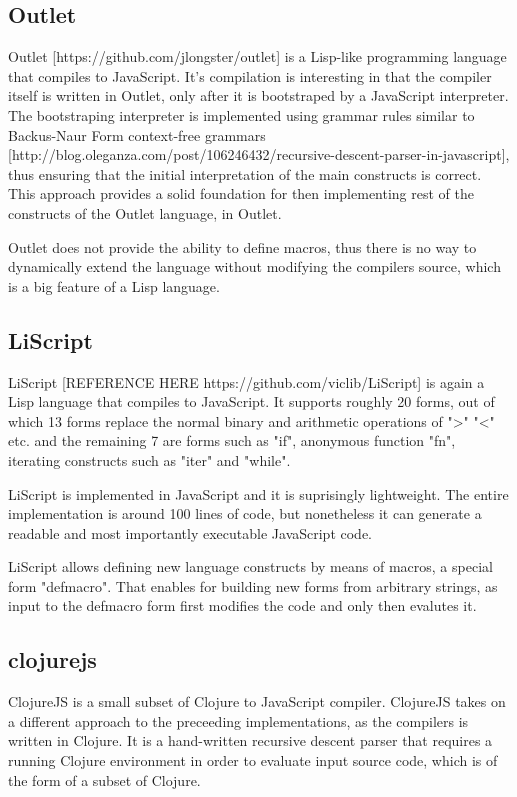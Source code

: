 \subsection{Outlet}
Outlet [https://github.com/jlongster/outlet] is a Lisp-like programming language that compiles to JavaScript. 
It's compilation is interesting in that the compiler itself is written in Outlet, only after it is bootstraped by a JavaScript interpreter.
The bootstraping interpreter is implemented using grammar rules similar to Backus-Naur Form context-free grammars [http://blog.oleganza.com/post/106246432/recursive-descent-parser-in-javascript], thus ensuring that the initial interpretation of the main constructs is correct. 
This approach provides a solid foundation for then implementing rest of the constructs of the Outlet language, in Outlet.

Outlet does not provide the ability to define macros, thus there is no way to dynamically extend the language without modifying the compilers source, which is a big feature of a Lisp language.

\subsection{LiScript}
LiScript [REFERENCE HERE https://github.com/viclib/LiScript] is again a Lisp language that compiles to JavaScript. It supports roughly 20 forms, out of which 13 forms replace the normal binary and arithmetic operations of ">" "<" etc. and the remaining 7 are forms such as "if", anonymous function "fn", iterating constructs such as "iter" and "while".

LiScript is implemented in JavaScript and it is suprisingly lightweight. The entire implementation is around 100 lines of code, but nonetheless it can generate a readable and most importantly executable JavaScript code. 

LiScript allows defining new language constructs by means of macros, a special form "defmacro". That enables for building new forms from arbitrary strings, as input to the defmacro form first modifies the code and only then evalutes it. 

\subsection{clojurejs}
ClojureJS is a small subset of Clojure to JavaScript compiler.
ClojureJS takes on a different approach to the preceeding implementations, as the compilers is written in Clojure. 
It is a hand-written recursive descent parser that requires a running Clojure environment in order to evaluate input source code, which is of the form of a subset of Clojure.


